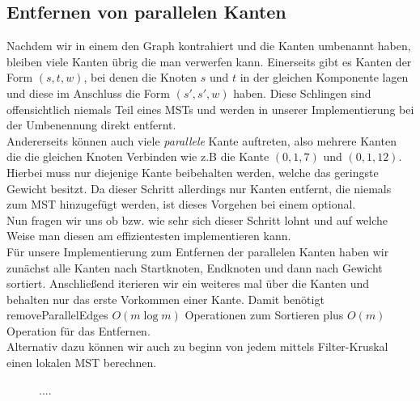 \subsection{Entfernen von parallelen Kanten}\label{remove-Section}
Nachdem wir in einem \boruvkaStep den Graph kontrahiert und die Kanten umbenannt haben, bleiben viele Kanten übrig die man verwerfen kann. Einerseits gibt es Kanten der Form $(s,t,w)$, bei denen die Knoten $s$ und $t$ in der gleichen Komponente lagen und diese im Anschluss die Form $(s',s',w)$ haben. Diese Schlingen sind offensichtlich niemals Teil eines MSTs und werden in unserer Implementierung bei der Umbenennung direkt entfernt.\\
Andererseits können auch viele \emph{parallele} Kante auftreten, also mehrere Kanten die die gleichen Knoten Verbinden wie z.B die Kante $(0,1,7)$ und $(0,1,12)$. Hierbei muss nur diejenige Kante beibehalten werden, welche das geringste Gewicht besitzt. Da dieser Schritt allerdings nur Kanten entfernt, die niemals zum MST hinzugefügt werden, ist dieses Vorgehen bei einem \boruvkaStep optional. \\
Nun fragen wir uns ob bzw. wie sehr sich dieser Schritt lohnt und auf welche Weise man diesen am effizientesten implementieren kann.\\
Für unsere Implementierung zum Entfernen der parallelen Kanten haben wir zunächst alle Kanten nach Startknoten, Endknoten und dann nach Gewicht sortiert. Anschließend iterieren wir ein weiteres mal über die Kanten und behalten nur das erste Vorkommen einer Kante. Damit benötigt removeParallelEdges $O(m\log m)$ Operationen zum Sortieren plus $O(m)$ Operation für das Entfernen.\\
Alternativ dazu können wir auch zu beginn von jedem \boruvkaStep mittels Filter-Kruskal einen lokalen MST berechnen.\\


\begin{figure}[H]
    \centering
    
    
    
    \caption{....}
    \label{RemoveParallel-Img}
\end{figure}

